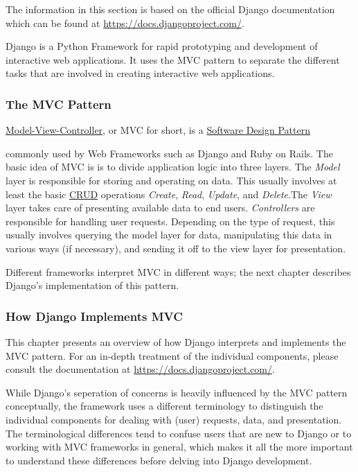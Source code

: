 The information in this section is based on the official Django
documentation which can be found at
\url{https://docs.djangoproject.com/}.

Django is a Python Framework for rapid prototyping and development of
interactive web applications. It uses the MVC pattern to separate the
different tasks that are involved in creating interactive web
applications.

\subsubsection{The MVC Pattern}
\label{sec:mvc}

\href{https://en.wikipedia.org/wiki/Model_view_controller}{Model-View-Controller},
or MVC for short, is a
\href{https://en.wikipedia.org/wiki/Software_design_pattern}{Software Design Pattern}

commonly used by Web Frameworks such as Django and Ruby on Rails. The
basic idea of MVC is is to divide application logic into three layers.
The \emph{Model} layer is responsible for storing and operating on
data. This usually involves at least the basic
\href{https://en.wikipedia.org/wiki/CRUD}{CRUD} operations
\emph{Create}, \emph{Read}, \emph{Update}, and \emph{Delete}.The
\emph{View} layer takes care of presenting available data to end
users. \emph{Controllers} are responsible for handling user requests.
Depending on the type of request, this usually involves querying the
model layer for data, manipulating this data in various ways (if
necessary), and sending it off to the view layer for presentation.

Different frameworks interpret MVC in different ways; the next chapter
describes Django's implementation of this pattern.

\subsubsection{How Django Implements MVC}
\label{sec:django-mvc}

This chapter presents an overview of how Django interprets and
implements the MVC pattern. For an in-depth treatment of the
individual components, please consult the documentation at
\url{https://docs.djangoproject.com/}.

While Django's seperation of concerns is heavily influenced by the MVC
pattern conceptually, the framework uses a different terminology to
distinguish the individual components for dealing with (user)
requests, data, and presentation. The terminological differences tend
to confuse users that are new to Django or to working with MVC
frameworks in general, which makes it all the more important to
understand these differences before delving into Django development.

